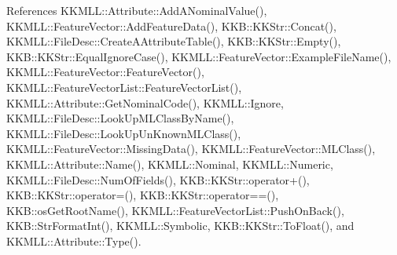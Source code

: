 References K\+K\+M\+L\+L\+::\+Attribute\+::\+Add\+A\+Nominal\+Value(), K\+K\+M\+L\+L\+::\+Feature\+Vector\+::\+Add\+Feature\+Data(), K\+K\+B\+::\+K\+K\+Str\+::\+Concat(), K\+K\+M\+L\+L\+::\+File\+Desc\+::\+Create\+A\+Attribute\+Table(), K\+K\+B\+::\+K\+K\+Str\+::\+Empty(), K\+K\+B\+::\+K\+K\+Str\+::\+Equal\+Ignore\+Case(), K\+K\+M\+L\+L\+::\+Feature\+Vector\+::\+Example\+File\+Name(), K\+K\+M\+L\+L\+::\+Feature\+Vector\+::\+Feature\+Vector(), K\+K\+M\+L\+L\+::\+Feature\+Vector\+List\+::\+Feature\+Vector\+List(), K\+K\+M\+L\+L\+::\+Attribute\+::\+Get\+Nominal\+Code(), K\+K\+M\+L\+L\+::\+Ignore, K\+K\+M\+L\+L\+::\+File\+Desc\+::\+Look\+Up\+M\+L\+Class\+By\+Name(), K\+K\+M\+L\+L\+::\+File\+Desc\+::\+Look\+Up\+Un\+Known\+M\+L\+Class(), K\+K\+M\+L\+L\+::\+Feature\+Vector\+::\+Missing\+Data(), K\+K\+M\+L\+L\+::\+Feature\+Vector\+::\+M\+L\+Class(), K\+K\+M\+L\+L\+::\+Attribute\+::\+Name(), K\+K\+M\+L\+L\+::\+Nominal, K\+K\+M\+L\+L\+::\+Numeric, K\+K\+M\+L\+L\+::\+File\+Desc\+::\+Num\+Of\+Fields(), K\+K\+B\+::\+K\+K\+Str\+::operator+(), K\+K\+B\+::\+K\+K\+Str\+::operator=(), K\+K\+B\+::\+K\+K\+Str\+::operator==(), K\+K\+B\+::os\+Get\+Root\+Name(), K\+K\+M\+L\+L\+::\+Feature\+Vector\+List\+::\+Push\+On\+Back(), K\+K\+B\+::\+Str\+Format\+Int(), K\+K\+M\+L\+L\+::\+Symbolic, K\+K\+B\+::\+K\+K\+Str\+::\+To\+Float(), and K\+K\+M\+L\+L\+::\+Attribute\+::\+Type().


